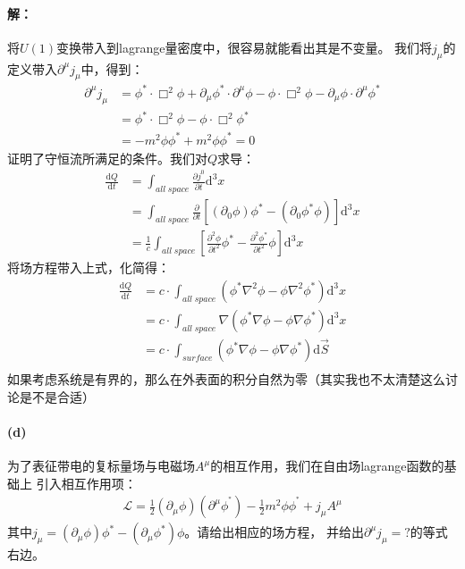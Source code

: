 \documentclass[a4paper]{ctexart}
\def\d{\mathrm{d}}
\begin{document}
    \paragraph{解：}
    将$U(1)$变换带入到lagrange量密度中，很容易就能看出其是不变量。
    我们将$j_{\mu}$的定义带入$\partial^{\mu}j_{\mu}$中，得到：
    \begin{align}
        \partial^{\mu}j_{\mu} &= \phi^{\ast}\cdot\Box^{2}\phi + \partial_{\mu}\phi^{\ast}\cdot\partial^{\mu}\phi -
        \phi\cdot\Box^{2}\phi - \partial_{\mu}\phi\cdot\partial^{\mu}\phi^{\ast}\\
        &= \phi^{\ast}\cdot\Box^{2}\phi - \phi\cdot\Box^{2}\phi^{\ast}\\
        &= -m^{2}\phi\phi^{\ast} + m^{2}\phi\phi^{\ast} = 0
    \end{align}
    证明了守恒流所满足的条件。我们对$Q$求导：
    \begin{align}
        \frac{\d Q}{\d t} &= \int_{all\;space}\frac{\partial j^{0}}{\partial t} \d^{3}x\\
        & = \int_{all \; space} \frac{\partial}{\partial t}\left[(\partial_{0}\phi)\phi^{\ast} - (\partial_{0}\phi^{\ast}\phi)\right]\d^{3}x\\
        & = \frac{1}{c}\int_{all\;space}\left[\frac{\partial^{2}\phi}{\partial t^{2}}\phi^{\ast} - \frac{\partial^{2}\phi^{\ast}}{\partial t^{2}}\phi\right]\d^{3}x
    \end{align}
    将场方程带入上式，化简得：
    \begin{align}
    \frac{\d Q}{\d t} &= c\cdot \int_{all\;space}(\phi^{\ast}\nabla^{2}\phi - \phi\nabla^{2}\phi^{\ast})\d ^{3}x\\
    & = c\cdot\int_{all\;space}\nabla(\phi^{\ast}\nabla\phi - \phi\nabla\phi^{\ast})\d^{3}x\\
    & = c\cdot\int_{surface}(\phi^{\ast}\nabla\phi - \phi\nabla\phi^{\ast})\d \vec{S}\\
    \end{align}
    如果考虑系统是有界的，那么在外表面的积分自然为零（其实我也不太清楚这么讨论是不是合适）
    \paragraph{(d)}\;为了表征带电的复标量场与电磁场$A^{\mu}$的相互作用，我们在自由场lagrange函数的基础上
    引入相互作用项：
    \begin{align}
        \mathcal{L} = \frac{1}{2}(\partial_{\mu}\phi)(\partial^{\mu}\phi^{^{\ast}}) - \frac{1}{2}m^{2}\phi\phi^{^{\ast}} + j_{\mu}A^{\mu}
    \end{align}
    其中$j_{\mu} = (\partial_{\mu}\phi)\phi^{\ast} - (\partial_{\mu}\phi^{\ast})\phi$。请给出相应的场方程，
    并给出$\partial^{\mu}j_{\mu} =?$的等式右边。
\end{document}
